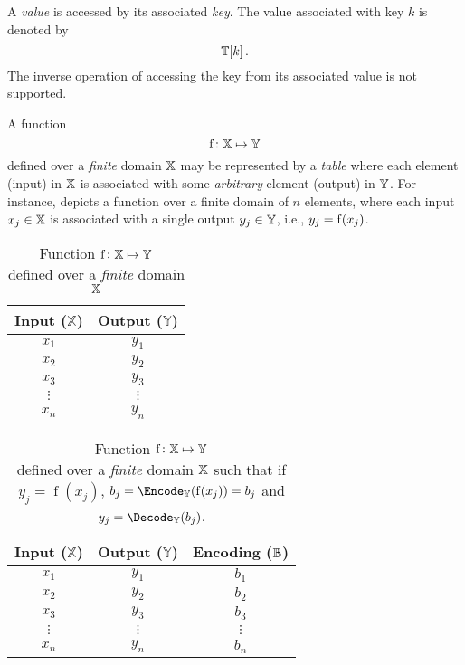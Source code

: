 \documentclass[ ../main.tex]{subfiles}
\begin{document}
A \emph{value} is accessed by its associated \emph{key}. The value associated with key $k$ is denoted by
\begin{equation}
    \mathbb{T}[k]\,.
\end{equation}
The inverse operation of accessing the key from its associated value is not supported.

A function
\begin{equation}
    \operatorname{f} \colon \mathbb{X} \mapsto \mathbb{Y}
\end{equation}
defined over a \emph{finite} domain $\mathbb{X}$ may be represented by a \emph{table} where each element (input) in $\mathbb{X}$ is associated with some \emph{arbitrary} element (output) in $\mathbb{Y}$. For instance,  depicts a function over a finite domain of $n$ elements, where each input $x_j \in \mathbb{X}$ is associated with a single output $y_j \in \mathbb{Y}$, i.e., $y_j = \operatorname{f}(x_j)$.
\begin{table}
\centering
\caption{Function $\operatorname{f} \colon \mathbb{X} \mapsto \mathbb{Y}$\\defined over a \emph{finite} domain $\mathbb{X}$}
\label{tbl:tabfunc}
\begin{tabular}{|c c|} 
\hline
Input ($\mathbb{X}$) & Output ($\mathbb{Y}$)\\
\hline
    $x_1$ & $y_1$\\
    $x_2$ & $y_2$\\
    $x_3$ & $y_3$\\
    $\vdots$ & $\vdots$\\
    $x_n$ & $y_n$\\
\hline
\end{tabular}
\end{table}




\begin{table}
\centering
\caption[short title]{Function $\operatorname{f} \colon \mathbb{X} \mapsto \mathbb{Y}$\\defined over a \emph{finite} domain $\mathbb{X}$ such that if $y_j = \operatorname{f}(x_j)$, $b_j = \Encode_{\Y}(\operatorname{f}(x_j)) = b_j$ and $y_j = \Decode_{\Y}(b_j)$.}
\label{tbl:tabfunc}
\begin{tabular}{|c c c|} 
\hline
Input ($\mathbb{X}$) & Output ($\mathbb{Y}$) & Encoding ($\mathbb{B}$)\\
\hline
    $x_1$ & $y_1$ & $b_1$\\
    $x_2$ & $y_2$ & $b_2$\\
    $x_3$ & $y_3$ & $b_3$\\
    $\vdots$ & $\vdots$ & $\vdots$\\
    $x_n$ & $y_n$ & $b_n$\\
\hline
\end{tabular}
\end{table}
\end{document}

